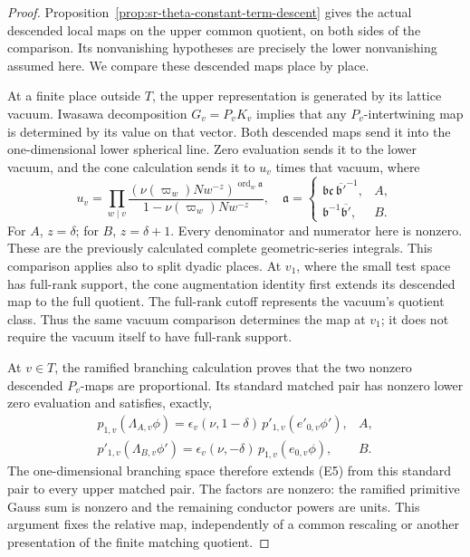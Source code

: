 \begin{proof}
Proposition~\ref{prop:sr-theta-constant-term-descent} gives
the actual descended local maps on the upper common quotient,
on both sides of the comparison. Its nonvanishing hypotheses
are precisely the lower nonvanishing assumed here.
We compare these descended maps place by place.

At a finite place outside \(T\), the upper representation is
generated by its lattice vacuum. Iwasawa decomposition
\(G_v=P_vK_v\) implies that any \(P_v\)-intertwining map
is determined by its value on that vector.
Both descended maps send it into the one-dimensional lower
spherical line. Zero evaluation sends it to the lower vacuum,
and the cone calculation sends it to
\(u_v\) times that vacuum, where
\[
 u_v=\prod_{w\mid v}
       \frac{(\nu(\varpi_w)Nw^{-z})^{\operatorname{ord}_w\mathfrak a}}
                     {1-\nu(\varpi_w)Nw^{-z}},
 \quad
 \mathfrak a=
 \begin{cases}
  \mathfrak b\mathfrak c\,\overline{\mathfrak b'}^{-1},&A,\\
  \mathfrak b^{-1}\overline{\mathfrak b'},&B.
 \end{cases}                                      \tag{E4}
 \label{eq:sr-theta-endgame-unramified-scalar}
\]
For \(A\), \(z=\delta\); for \(B\), \(z=\delta+1\).
Every denominator and numerator here is nonzero.
These are the previously calculated complete geometric-series
integrals. This comparison applies also to split dyadic places.
At \(v_1\), where the small test space has full-rank support,
the cone augmentation identity first extends its descended
map to the full quotient. The full-rank cutoff represents
the vacuum's quotient class. Thus the same vacuum comparison
determines the map at \(v_1\); it does not require the vacuum
itself to have full-rank support.

At \(v\in T\), the ramified branching calculation proves that
the two nonzero descended \(P_v\)-maps are proportional.
Its standard matched pair has nonzero lower zero evaluation
and satisfies, exactly,
\[
 \begin{array}{ll}
  p_{1,v}(\Lambda_{A,v}\phi)
    =\epsilon_v(\nu,1-\delta)\,
                         p'_{1,v}(e'_{0,v}\phi'),& A,\\
  p'_{1,v}(\Lambda_{B,v}\phi')
    =\epsilon_v(\nu,-\delta)\,
                         p_{1,v}(e_{0,v}\phi),& B.
 \end{array}                                      \tag{E5}
 \label{eq:sr-theta-endgame-ramified-scalar}
\]
The one-dimensional branching space therefore extends (E5)
from this standard pair to every upper matched pair.
The factors are nonzero: the ramified primitive Gauss sum is
nonzero and the remaining conductor powers are units.
This argument fixes the relative map, independently of a
common rescaling or another presentation of the finite
matching quotient.


\end{proof}
